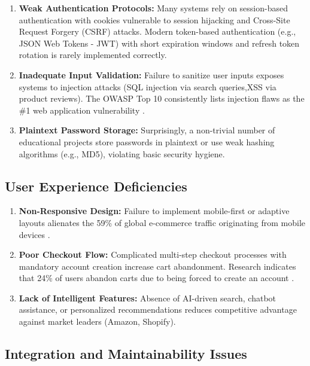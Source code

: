 \documentclass[12pt, a4paper]{report}
\begin{document}
\begin{enumerate}
    \item \textbf{Weak Authentication Protocols:} Many systems rely on session-based authentication with cookies vulnerable to session hijacking and Cross-Site Request Forgery (CSRF) attacks. Modern token-based authentication (e.g., JSON Web Tokens - JWT) with short expiration windows and refresh token rotation is rarely implemented correctly.
    
    \item \textbf{Inadequate Input Validation:} Failure to sanitize user inputs exposes systems to injection attacks (SQL injection via search queries,XSS via product reviews). The OWASP Top 10 consistently lists injection flaws as the \#1 web application vulnerability \cite{owasp2021}.
    
    \item \textbf{Plaintext Password Storage:} Surprisingly, a non-trivial number of educational projects store passwords in plaintext or use weak hashing algorithms (e.g., MD5), violating basic security hygiene.
\end{enumerate}

\subsection{User Experience Deficiencies}

\begin{enumerate}
    \item \textbf{Non-Responsive Design:} Failure to implement mobile-first or adaptive layouts alienates the 59\% of global e-commerce traffic originating from mobile devices \cite{statcounter2024}.
    
    \item \textbf{Poor Checkout Flow:} Complicated multi-step checkout processes with mandatory account creation increase cart abandonment. Research indicates that 24\% of users abandon carts due to being forced to create an account \cite{baymard2023}.
    
    \item \textbf{Lack of Intelligent Features:} Absence of AI-driven search, chatbot assistance, or personalized recommendations reduces competitive advantage against market leaders (Amazon, Shopify).
\end{enumerate}

\subsection{Integration and Maintainability Issues}
\end{document}
